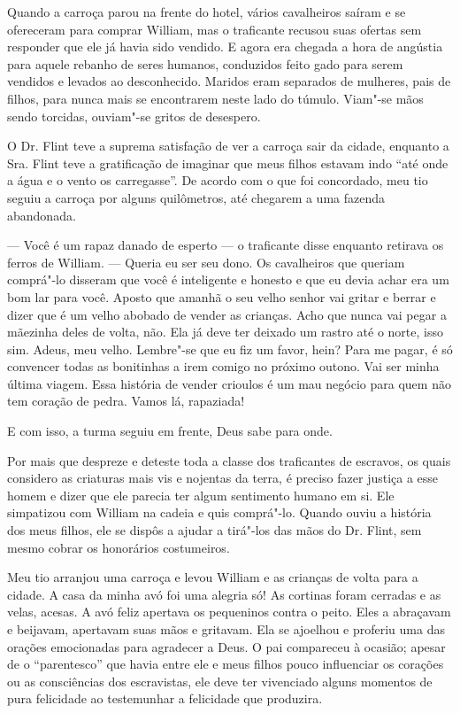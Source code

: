 Quando a carroça parou na frente do
hotel, vários cavalheiros saíram e se ofereceram para comprar William,
mas o traficante recusou suas ofertas sem responder que ele já havia
sido vendido. E agora era chegada a hora de angústia para aquele rebanho
de seres humanos, conduzidos feito gado para serem vendidos e levados ao
desconhecido. Maridos eram separados de mulheres, pais de filhos, para
nunca mais se encontrarem neste lado do túmulo. Viam"-se mãos sendo
torcidas, ouviam"-se gritos de desespero.

O Dr. Flint teve a suprema satisfação
de ver a carroça sair da cidade, enquanto a Sra. Flint teve a
gratificação de imaginar que meus filhos estavam indo ``até onde a água
e o vento os carregasse''. De acordo com o que foi concordado, meu tio
seguiu a carroça por alguns quilômetros, até chegarem a uma fazenda
abandonada.

--- Você é um rapaz danado de esperto --- o traficante disse enquanto
retirava os ferros de William. --- Queria eu ser seu dono. Os
cavalheiros que queriam comprá"-lo disseram que você é inteligente e
honesto e que eu devia achar era um bom lar para você. Aposto que amanhã
o seu velho senhor vai gritar e berrar e dizer que é um velho abobado de
vender as crianças. Acho que nunca vai pegar a mãezinha deles de volta,
não. Ela já deve ter deixado um rastro até o norte, isso sim. Adeus, meu
velho. Lembre"-se que eu fiz um favor, hein? Para me pagar, é só
convencer todas as bonitinhas a irem comigo no próximo outono. Vai ser
minha última viagem. Essa história de vender crioulos é um mau negócio
para quem não tem coração de pedra. Vamos lá, rapaziada!

E com isso, a turma seguiu em frente, Deus sabe para onde.

Por mais que despreze e deteste toda a
classe dos traficantes de escravos, os quais considero as criaturas mais
vis e nojentas da terra, é preciso fazer justiça a esse homem e dizer
que ele parecia ter algum sentimento humano em si. Ele simpatizou com
William na cadeia e quis comprá"-lo. Quando ouviu a história dos meus
filhos, ele se dispôs a ajudar a tirá"-los das mãos do Dr. Flint, sem
mesmo cobrar os honorários costumeiros.

Meu tio arranjou uma carroça e levou
William e as crianças de volta para a cidade. A casa da minha avó foi
uma alegria só! As cortinas foram cerradas e as velas, acesas. A avó
feliz apertava os pequeninos contra o peito. Eles a abraçavam e
beijavam, apertavam suas mãos e gritavam. Ela se ajoelhou e proferiu uma
das orações emocionadas para agradecer a Deus. O pai compareceu à
ocasião; apesar de o ``parentesco'' que havia entre ele e meus filhos
pouco influenciar os corações ou as consciências dos escravistas, ele
deve ter vivenciado alguns momentos de pura felicidade ao testemunhar a
felicidade que produzira.

